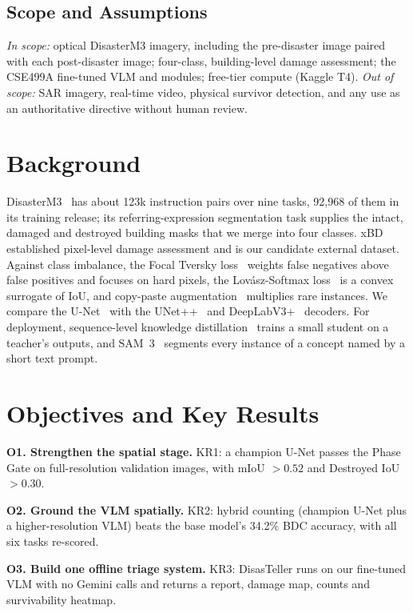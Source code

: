 \documentclass[conference]{IEEEtran}
\begin{document}
\subsection{Scope and Assumptions}
\textit{In scope:} optical DisasterM3 imagery, including the pre-disaster image paired with each post-disaster image; four-class, building-level damage assessment; the CSE499A fine-tuned VLM and modules; free-tier compute (Kaggle T4). \textit{Out of scope:} SAR imagery, real-time video, physical survivor detection, and any use as an authoritative directive without human review.

\section{Background}
DisasterM3~\cite{disasterm3} has about 123k instruction pairs over nine tasks, 92,968 of them in its training release; its referring-expression segmentation task supplies the intact, damaged and destroyed building masks that we merge into four classes. xBD~\cite{xbd} established pixel-level damage assessment and is our candidate external dataset. Against class imbalance, the Focal Tversky loss~\cite{focaltversky} weights false negatives above false positives and focuses on hard pixels, the Lov\'asz-Softmax loss~\cite{lovasz} is a convex surrogate of IoU, and copy-paste augmentation~\cite{copypaste} multiplies rare instances. We compare the U-Net~\cite{unet} with the UNet++~\cite{unetpp} and DeepLabV3+~\cite{deeplab} decoders. For deployment, sequence-level knowledge distillation~\cite{seqkd} trains a small student on a teacher's outputs, and SAM~3~\cite{sam3} segments every instance of a concept named by a short text prompt.

\section{Objectives and Key Results}
\textbf{O1. Strengthen the spatial stage.} KR1: a champion U-Net passes the Phase Gate on full-resolution validation images, with mIoU $>0.52$ and Destroyed IoU $>0.30$.

\textbf{O2. Ground the VLM spatially.} KR2: hybrid counting (champion U-Net plus a higher-resolution VLM) beats the base model's 34.2\% BDC accuracy, with all six tasks re-scored.

\textbf{O3. Build one offline triage system.} KR3: DisasTeller runs on our fine-tuned VLM with no Gemini calls and returns a report, damage map, counts and survivability heatmap.
\end{document}
